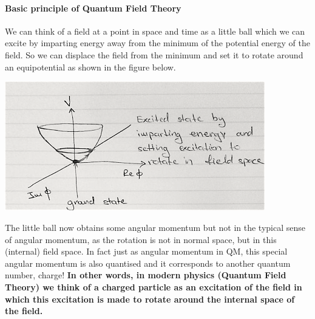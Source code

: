 \paragraph{Basic principle of Quantum Field Theory}
We can think of a field at a point in space and time as a little ball which we can excite by imparting energy away from the minimum of the potential energy of the field. So we can displace the field from the minimum and set it to rotate around an equipotential as shown in the figure below. 
\begin{center}
\includegraphics[width=0.85\textwidth]{fig/higgs/field_excitation_bw.png}
\end{center}
The little ball now obtains some angular momentum but not in the typical sense of angular momentum, as the rotation is not in normal space, but in this (internal) field space. In fact just as angular momentum in QM, this special angular momentum is also quantised and it corresponds to another quantum number, charge! {\bf In other words, in modern physics (Quantum Field Theory) we think of a charged particle as an excitation of the field in which this excitation is made to rotate around the internal space of the field.}


